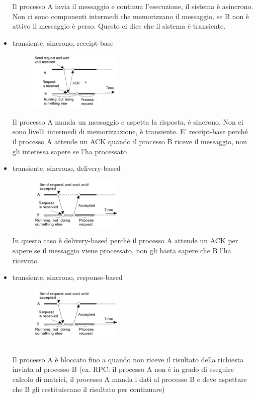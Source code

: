 \documentclass[12pt,italian]{report}
\begin{document}
\begin{itemize}
    Il processo A invia il messaggio e continua l'esecuzione, il sistema è asincrono. Non ci sono componenti intermedi che memorizzano il messaggio, se B non è attivo il messaggio è perso. Questo ci dice che il sistema è transiente.
    
    \item transiente, sincrono, receipt-base
     \begin{figure}[h]
    \centering
    \includegraphics[width=45mm]{img/comm4.png}
    \end{figure}

    Il processo A manda un messaggio e aspetta la risposta, è sincrono. Non ci sono livelli intermedi di memorizzazione, è transiente. E' receipt-base perché il processo A attende un ACK quando il processo B riceve il messaggio, non gli interessa sapere se l'ha processato
    
    \item transiente, sincrono, delivery-based
     \begin{figure}[h]
    \centering
    \includegraphics[width=45mm]{img/comm5.png}
    \end{figure}
    
    In questo caso è delivery-based perchè il processo A attende un ACK per sapere se il messaggio viene processato, non gli basta sapere che B l'ha ricevuto
    
    \item transiente, sincrono, response-based
     \begin{figure}[h]
    \centering
    \includegraphics[width=45mm]{img/comm5.png}
    \end{figure}
    \\
    Il processo A è bloccato fino a quando non riceve il risultato della richiesta inviata al processo B (ex. RPC: il processo A non è in grado di eseguire calcolo di matrici, il processo A manda i dati al processo B e deve aspettare che B gli restituiscano il risultato per continuare)
\end{itemize}
\end{document}
